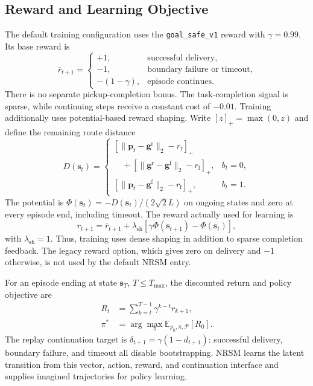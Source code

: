 \documentclass{article}
\begin{document}
\subsection{Reward and Learning Objective}

The default training configuration uses the \texttt{goal\_safe\_v1} reward with $\gamma=0.99$. Its base reward is
\begin{equation}
\bar r_{t+1}=\begin{cases}
+1, & \text{successful delivery},\\
-1, & \text{boundary failure or timeout},\\
-(1-\gamma), & \text{episode continues}.
\end{cases}
\label{eq:uav_sparse_reward}
\end{equation}
There is no separate pickup-completion bonus. The task-completion signal is sparse, while continuing steps receive a constant cost of $-0.01$. Training additionally uses potential-based reward shaping. Write $[z]_+=\max(0,z)$ and define the remaining route distance
\begin{equation}
D(\mathbf s_t)=\begin{cases}
[\|\mathbf p_t-\mathbf g^{\mathrm r}\|_2-r_{\mathrm r}]_+\\
\quad+[\|\mathbf g^{\mathrm r}-\mathbf g^{\mathrm f}\|_2-r_{\mathrm f}]_+,
& b_t=0,\\
[\|\mathbf p_t-\mathbf g^{\mathrm f}\|_2-r_{\mathrm f}]_+,
& b_t=1.
\end{cases}
\label{eq:uav_remaining_distance}
\end{equation}
The potential is $\Phi(\mathbf s_t)=-D(\mathbf s_t)/(2\sqrt{2}L)$ on ongoing states and zero at every episode end, including timeout. The reward actually used for learning is
\begin{equation}
r_{t+1}=\bar r_{t+1}+\lambda_{\mathrm{sh}}
\left[\gamma\Phi(\mathbf s_{t+1})-\Phi(\mathbf s_t)\right],
\label{eq:uav_shaped_reward}
\end{equation}
with $\lambda_{\mathrm{sh}}=1$. Thus, training uses dense shaping in addition to sparse completion feedback. The legacy reward option, which gives zero on delivery and $-1$ otherwise, is not used by the default NRSM entry.

For an episode ending at state $\mathbf s_T$, $T\le T_{\max}$, the discounted return and policy objective are
\begin{align}
R_t&=\sum_{k=t}^{T-1}\gamma^{k-t}r_{k+1},
\label{eq:uav_return}\\
\pi^*&=\arg\max_{\pi}\mathbb E_{\rho_0,\pi,\mathcal P}[R_0].
\label{eq:uav_return_objective}
\end{align}
The replay continuation target is $\delta_{t+1}=\gamma(1-d_{t+1})$: successful delivery, boundary failure, and timeout all disable bootstrapping. NRSM learns the latent transition from this vector, action, reward, and continuation interface and supplies imagined trajectories for policy learning.
\end{document}
